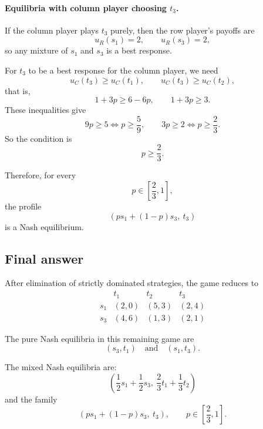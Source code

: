 \paragraph{Equilibria with column player choosing \(t_3\).}
If the column player plays \(t_3\) purely, then the row player's payoffs are
\[
u_R(s_1)=2,\qquad u_R(s_3)=2,
\]
so any mixture of \(s_1\) and \(s_3\) is a best response.

For \(t_3\) to be a best response for the column player, we need
\[
u_C(t_3)\ge u_C(t_1),\qquad u_C(t_3)\ge u_C(t_2),
\]
that is,
\[
1+3p \ge 6-6p,\qquad 1+3p \ge 3.
\]
These inequalities give
\[
9p\ge 5 \iff p\ge \frac{5}{9},
\qquad
3p\ge 2 \iff p\ge \frac23.
\]
So the condition is
\[
p\ge \frac23.
\]

Therefore, for every
\[
p\in\left[\frac23,1\right],
\]
the profile
\[
\boxed{\left(ps_1+(1-p)s_3,\ t_3\right)}
\]
is a Nash equilibrium.

\subsection*{Final answer}

After elimination of strictly dominated strategies, the game reduces to
\[
\boxed{
\begin{array}{c|ccc}
 & t_1 & t_2 & t_3\\
\hline
s_1 & (2,0) & (5,3) & (2,4)\\
s_3 & (4,6) & (1,3) & (2,1)
\end{array}}
\]

The pure Nash equilibria in this remaining game are
\[
\boxed{(s_3,t_1)\quad \text{and}\quad (s_1,t_3).}
\]

The mixed Nash equilibria are:
\[
\boxed{\left(\frac12 s_1+\frac12 s_3,\ \frac23 t_1+\frac13 t_2\right)}
\]
and the family
\[
\boxed{\left(ps_1+(1-p)s_3,\ t_3\right),\qquad p\in\left[\frac23,1\right].}
\]
